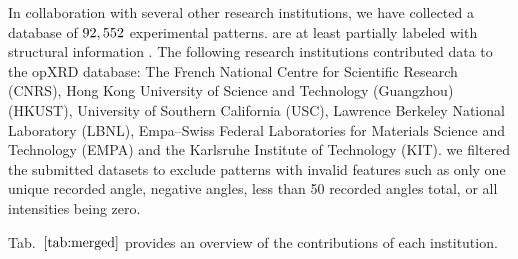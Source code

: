 In collaboration with several other research institutions, we have collected a database of $92,552$ experimental  patterns.  are at least partially labeled with structural information . The following research institutions contributed data to the opXRD database: The French National Centre for Scientific Research (CNRS), Hong Kong University of Science and Technology (Guangzhou) (HKUST), University of Southern California (USC), Lawrence Berkeley National Laboratory (LBNL), Empa–Swiss Federal Laboratories for Materials Science and Technology (EMPA) and the Karlsruhe Institute of Technology (KIT).  we filtered the submitted datasets to exclude patterns with invalid features such as only one unique recorded angle, negative angles, less than 50 recorded angles total, or all intensities being zero. 

 Tab.~$\eqref{tab:merged}$ provides an overview of the contributions of each institution. 

